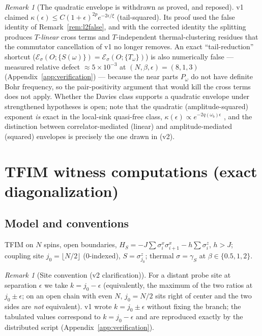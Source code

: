 \documentclass[11pt,a4paper]{article}
\theoremstyle{plain}
\theoremstyle{definition}
\theoremstyle{remark}
\newtheorem{remark}[theorem]{Remark}
\newcommand{\eps}{\epsilon}
\begin{document}
\begin{remark}[The quadratic envelope is withdrawn as proved, and reposed]
\label{rem:quadratic}
v1 claimed $\kappa(\eps) \le C(1+\eps)^{2p}e^{-2\eps/\xi}$ (tail-squared).
Its proof used the false identity of Remark~\ref{rem:l2false}, and with the
corrected identity the splitting produces $T$-\emph{linear} cross terms and
$T$-independent thermal-clustering residues that the commutator cancellation
of v1 no longer removes. An exact ``tail-reduction'' shortcut
($\mathcal{E}_\sigma(O; \{S(\omega)\}) = \mathcal{E}_\sigma(O;
\{T_\omega\})$) is also numerically false --- measured relative defect
$\approx 5\times 10^{-3}$ at $(N, \beta, \eps) = (8, 1, 3)$
(Appendix~\ref{app:verification}) --- because the near parts $P_\omega$ do
not have definite Bohr frequency, so the pair-positivity argument that would
kill the cross terms does not apply. Whether the Davies class supports a
quadratic envelope under strengthened hypotheses is open; note that the
quadratic (amplitude-squared) exponent \emph{is} exact in the local-sink
quasi-free class, $\kappa(\eps) \propto e^{-2q(\omega_b)\eps}$ \cite{HCut},
and the distinction between correlator-mediated (linear) and
amplitude-mediated (squared) envelopes is precisely the one drawn in
\cite{RIP} (v2).
\end{remark}

\section{TFIM witness computations (exact diagonalization)}\label{sec:tfim}

\subsection{Model and conventions}

TFIM on $N$ spins, open boundaries, $H_S = -J\sum\sigma^x_i\sigma^x_{i+1} -
h\sum\sigma^z_i$, $h > J$; coupling site $j_0 = \lfloor N/2\rfloor$
(0-indexed), $S = \sigma^z_{j_0}$; thermal $\sigma = \gamma_S$ at $\beta \in
\{0.5, 1, 2\}$.

\begin{remark}[Site convention (v2 clarification)]\label{rem:convention}
For a distant probe site at separation $\eps$ we take $k = j_0 - \eps$
(equivalently, the maximum of the two ratios at $j_0 \pm \eps$; on an open
chain with even $N$, $j_0 = N/2$ sits right of center and the two sides are
\emph{not} equivalent). v1 wrote $k = j_0 \pm \eps$ without fixing the
branch; the tabulated values correspond to $k = j_0 - \eps$ and are
reproduced exactly by the distributed script
(Appendix~\ref{app:verification}).
\end{remark}
\end{document}
